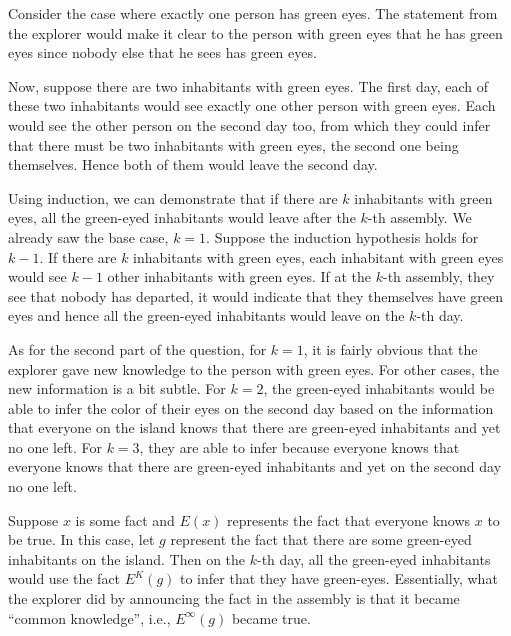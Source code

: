 Consider the case where exactly one person has green eyes. The
statement from the explorer would make it clear to the
person with green eyes that he  has green eyes since nobody else
that he sees has green eyes. 

Now, suppose there are two inhabitants with green eyes. 
The first day, each of these two inhabitants would see exactly one other person with
green eyes. Each would see the other person on the second day too, from which
they could infer that there must be two
inhabitants with green eyes, the second one being themselves. 
Hence both of them would leave the second day.

Using induction, we can demonstrate that if there are $k$ inhabitants
with green eyes, all the green-eyed inhabitants would leave after the 
$k$-th assembly. We already saw the base case, $k=1$. Suppose the
induction hypothesis  holds 
for $k-1$.  If there are $k$ inhabitants with green
eyes, each inhabitant with green eyes would see $k-1$ other
inhabitants with green eyes.
If at the $k$-th assembly, they see that nobody has departed, 
it would indicate that they themselves have green eyes and hence
all the green-eyed inhabitants would leave on the $k$-th day.

As for the second part of the question, for $k=1$, it is
fairly obvious that the explorer gave new knowledge to the person with
green eyes. For other cases, the new information is a bit subtle. For $k=2$, the green-eyed inhabitants would be able to infer
the color of their eyes on the second day based on the information that
everyone on the island knows that there are green-eyed inhabitants
and yet no one left. For $k=3$, they are able to infer
because everyone knows that everyone knows that there are green-eyed
inhabitants and yet on the second day no one left. 

Suppose $x$ is some fact and $E(x)$ represents the fact that everyone knows $x$ to be true. In this case, let $g$ represent the fact
that there are some green-eyed inhabitants on the island. Then on the $k$-th day, all the green-eyed
inhabitants would use the fact $E^K(g)$ to infer that they have green-eyes.
Essentially, what the explorer did by announcing the fact in the assembly is that it became ``common knowledge'', i.e., $E^{\infty}(g)$ became true. 

